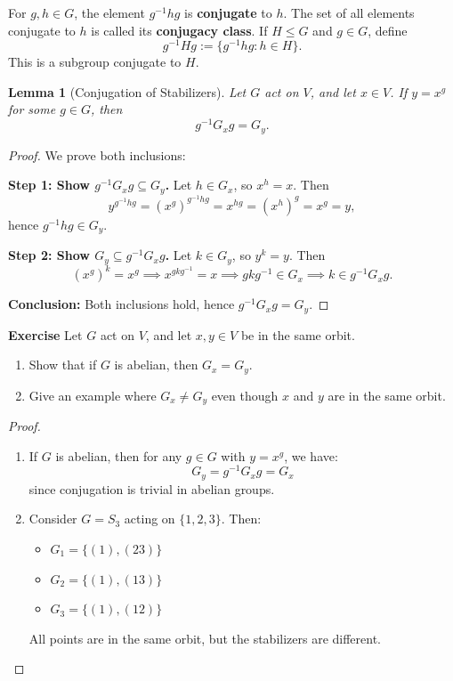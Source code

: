 \documentclass[12pt,a4paper,openany]{book}
\newtheorem{lemma}{Lemma}[section]
\begin{document}
\bigskip
For $g,h \in G$, the element $g^{-1}hg$ is \textbf{conjugate} to $h$. The set of all elements conjugate to $h$ is called its \textbf{conjugacy class}. If $H \le G$ and $g \in G$, define
\[
g^{-1} H g := \{ g^{-1} h g : h \in H \}.
\]
This is a subgroup conjugate to $H$.


\begin{lemma}[Conjugation of Stabilizers]\label{lem:conjugate-stabilizer}
Let $G$ act on $V$, and let $x \in V$. If $y = x^g$ for some $g \in G$, then
\[
g^{-1} G_x g = G_y.
\]
\end{lemma}

\begin{proof}
We prove both inclusions:

\textbf{Step 1: Show $g^{-1} G_x g \subseteq G_y$.}  
Let $h \in G_x$, so $x^h = x$. Then
\[
y^{g^{-1} h g} = (x^g)^{g^{-1} h g} = x^{h g} = (x^h)^g = x^g = y,
\]
hence $g^{-1} h g \in G_y$.

\textbf{Step 2: Show $G_y \subseteq g^{-1} G_x g$.}  
Let $k \in G_y$, so $y^k = y$. Then
\[
(x^g)^k = x^g \implies x^{g k g^{-1}} = x \implies g k g^{-1} \in G_x \implies k \in g^{-1} G_x g.
\]

\textbf{Conclusion:} Both inclusions hold, hence $g^{-1} G_x g = G_y$.
\end{proof}

\bigskip\noindent\textbf{Exercise}\label{ex:conjugate-stabilizers}
Let $G$ act on $V$, and let $x, y \in V$ be in the same orbit.
\begin{enumerate}
\item Show that if $G$ is abelian, then $G_x = G_y$.
\item Give an example where $G_x \neq G_y$ even though $x$ and $y$ are in the same orbit.
\end{enumerate}


\begin{proof}
\begin{enumerate}
\item If $G$ is abelian, then for any $g \in G$ with $y = x^g$, we have:
\[
G_y = g^{-1} G_x g = G_x
\]
since conjugation is trivial in abelian groups.
\item Consider $G = S_3$ acting on $\{1,2,3\}$. Then:
\begin{itemize}
\item $G_1 = \{(1), (23)\}$
\item $G_2 = \{(1), (13)\}$
\item $G_3 = \{(1), (12)\}$
\end{itemize}
All points are in the same orbit, but the stabilizers are different.
\end{enumerate}
\end{proof}
\end{document}
